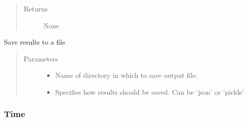 \documentclass[letterpaper,10pt,english]{sphinxmanual}
\begin{document}
\begin{fulllineitems}
\begin{fulllineitems}
\begin{quote}
\begin{description}
\begin{itemize}
\end{itemize}

\item[{Returns}] \leavevmode
None

\end{description}\end{quote}

\end{fulllineitems}


\begin{fulllineitems}
\label{\detokenize{index:feast.EmissionSimModules.simulation_classes.Scenario.save}}
Save results to a file
\begin{quote}\begin{description}
\item[{Parameters}] \leavevmode\begin{itemize}
\item {} 
 \textendash{} Name of directory in which to save output file.

\item {} 
 \textendash{} Specifies how results should be saved. Can be ‘json’ or ‘pickle’

\end{itemize}

\end{description}\end{quote}

\end{fulllineitems}


\end{fulllineitems}



\subsubsection{Time}
\label{\detokenize{index:time}}
\end{document}

